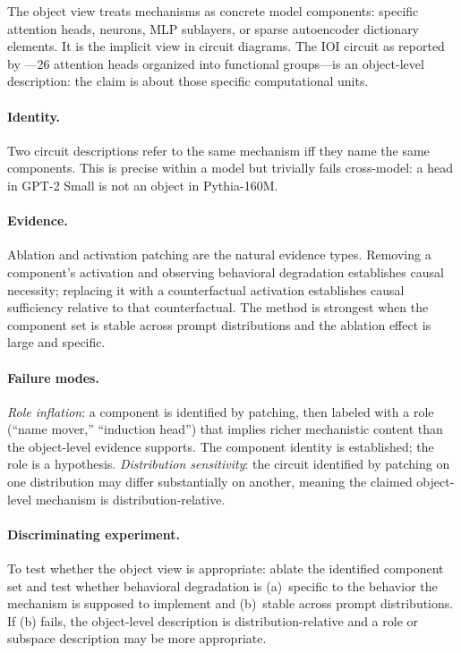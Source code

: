 \documentclass{article}
\begin{document}
The object view treats mechanisms as concrete model components: specific
attention heads, neurons, MLP sublayers, or sparse autoencoder dictionary
elements.  It is the implicit view in circuit diagrams.  The IOI circuit
as reported by \citet{wang2022}---26 attention heads organized into
functional groups---is an object-level description: the claim is about
those specific computational units.

\paragraph{Identity.}
Two circuit descriptions refer to the same mechanism iff they name the
same components.  This is precise within a model but trivially fails
cross-model: a head in GPT-2 Small is not an object in Pythia-160M.

\paragraph{Evidence.}
Ablation and activation patching are the natural evidence types.  Removing
a component's activation and observing behavioral degradation establishes
causal necessity; replacing it with a counterfactual activation establishes
causal sufficiency relative to that counterfactual.  The method is
strongest when the component set is stable across prompt distributions
and the ablation effect is large and specific.

\paragraph{Failure modes.}
\emph{Role inflation}: a component is identified by patching, then labeled
with a role (``name mover,'' ``induction head'') that implies richer
mechanistic content than the object-level evidence supports.  The component
identity is established; the role is a hypothesis.  \emph{Distribution
sensitivity}: the circuit identified by patching on one distribution may
differ substantially on another, meaning the claimed object-level mechanism
is distribution-relative.

\paragraph{Discriminating experiment.}
To test whether the object view is appropriate: ablate the identified
component set and test whether behavioral degradation is (a)~specific to
the behavior the mechanism is supposed to implement and (b)~stable across
prompt distributions.  If (b) fails, the object-level description is
distribution-relative and a role or subspace description may be more
appropriate.
\end{document}
